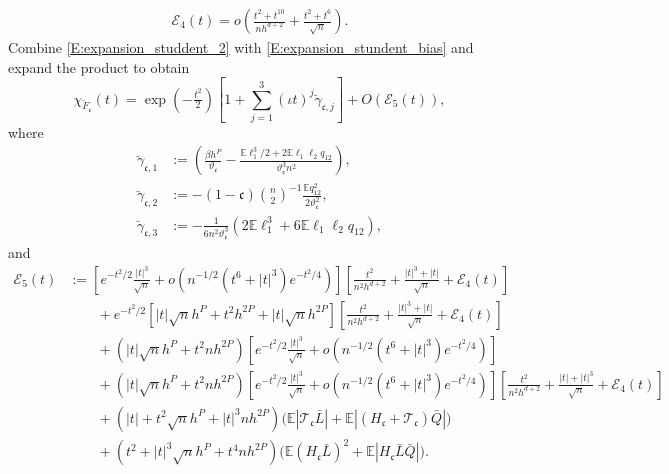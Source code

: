 \documentclass[11pt]{article}
\numberwithin{equation}{section}
\theoremstyle{definition}
\newcommand{\E}{\mathbb{E}}
\begin{document}
\begin{align*}
    \mathcal{E}_4(t) = o\left(\frac{t^2 + t^{10}}{nh^{d+2}} + \frac{t^2  + t^6}{\sqrt{n}}\right).
\end{align*}
Combine \eqref{E:expansion_studdent_2} with \eqref{E:expansion_stundent_bias} and expand the product to obtain
\begin{equation*}
     \chi_{\breve{F}_\mathfrak{c}}(t)= \exp\left(-\tfrac{t^2}{2}\right)\left[1 + \sum_{j=1}^3(\iota t)^j\breve{\gamma}_{\mathfrak{c},j}\right]+ O(\mathcal{E}_5(t)),
\end{equation*}
where
\begin{align*}
    \breve{\gamma}_{\mathfrak{c},1} &:= \left( \frac{\beta h^P}{\vartheta_\mathfrak{c}} - \frac{\E\ell_1^3/2 + 2\E\ell_1\ell_2 q_{12}}{\vartheta_\mathfrak{c}^3n^2}\right),\\
    \breve{\gamma}_{\mathfrak{c},2} &:= -(1-\mathfrak{c}) \binom{n}{2}^{-1}\frac{\E q_{12}^2}{2\vartheta_\mathfrak{c}^2},\\
    \breve{\gamma}_{\mathfrak{c},3} &:= -\frac{1}{6n^2\vartheta_\mathfrak{c}^3}(2\E\ell_1^3 + 6\E\ell_1\ell_2 q_{12}),
\end{align*}
and
\begin{align*}
\mathcal{E}_{5}(t)&:=\left[e^{-t^2/2}\tfrac{|t|^3}{\sqrt{n}}+o(n^{-1/2}(t^6 + |t|^3)e^{-t^2/4})\right]\left[\tfrac{t^2}{n^2h^{d+2}} + \tfrac{|t|^3 + |t|}{\sqrt{n}} + \mathcal{E}_{4}(t)\right]\\
&\qquad + e^{-t^2/2}\left[|t|\sqrt{n}h^P+t^2h^{2P} + |t|\sqrt{n}h^{2P}\right]\left[\tfrac{t^2}{n^2h^{d+2}} + \tfrac{|t|^3 + |t|}{\sqrt{n}} + \mathcal{E}_{4}(t)\right]\\
&\qquad +(|t|\sqrt{n}h^P + t^2nh^{2P})\left[e^{-t^2/2}\tfrac{|t|^3}{\sqrt{n}}+o(n^{-1/2}(t^6 + |t|^3)e^{-t^2/4})\right]\\
&\qquad +(|t|\sqrt{n}h^P + t^2nh^{2P})\left[e^{-t^2/2}\tfrac{|t|^3}{\sqrt{n}}+o(n^{-1/2}(t^6 + |t|^3)e^{-t^2/4})\right]\left[\tfrac{t^2}{n^2h^{d+2}} + \tfrac{|t|+|t|^3}{\sqrt{n}}+ \mathcal{E}_{4}(t)\right]\\
&\qquad +(|t|+t^2\sqrt{n}h^P + |t|^3nh^{2P})\big(\E|\mathcal{T}_\mathfrak{c}\bar{L}| + \E|(H_\mathfrak{c}+\mathcal{T}_\mathfrak{c})\bar{Q} |\big)\\
&\qquad +(t^2+|t|^3\sqrt{n}h^P + t^4 nh^{2P})\big(\E(H_\mathfrak{c}\bar{L})^2 + \E|H_\mathfrak{c}\bar{L}\bar{Q}|\big).
\end{align*}
\end{document}
